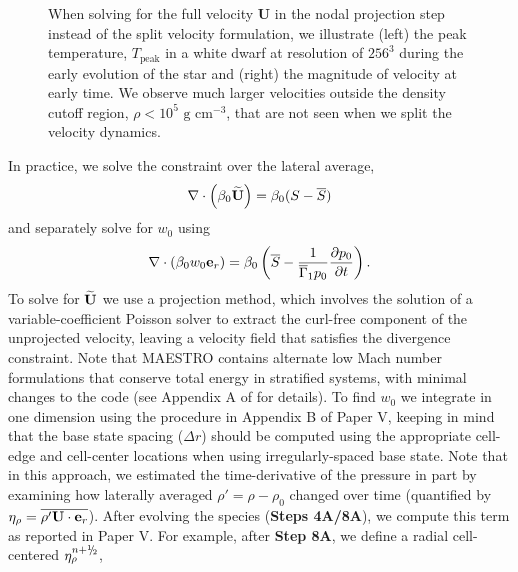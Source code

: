 \begin{figure}[htb]
\begin{center}
\begin{tabular}{l c}
\end{tabular}
\caption{\label{fig:wdconvect_splitU} When solving for the full velocity $\mathbf{U}$ in the nodal projection step instead of the split velocity 
  formulation, we illustrate
  (left) the peak temperature, $T_{\text{peak}}$ in a white dwarf at resolution of $256^3$ during the early evolution of the star and
  (right) the magnitude of velocity at early time. We observe much larger velocities outside the density cutoff region, $\rho < 10^5 \text{ g cm}^{-3}$, 
  that are not seen when we split the velocity dynamics.}
\end{center}
\end{figure}

In practice, we solve the constraint over the lateral average,
\begin{equation}
\nabla\cdot\left(\beta_0\Ubt\right) = \beta_0(S-\overline{S})
\end{equation}
and separately solve for $w_0$ using 
\begin{equation}
\nabla\cdot(\beta_0w_0\eb_r) = \beta_0\left(\overline{S} - \frac{1}{\gammaonebar p_0}\frac{\partial p_0}{\partial t}\right).
\end{equation}
To solve for $\widetilde{{\bf{U}}}$ we use a projection method, which involves the solution of a variable-coefficient Poisson solver to extract the curl-free component of the unprojected velocity, leaving a velocity field that satisfies the divergence constraint.
Note that MAESTRO contains alternate low Mach number formulations that conserve total energy in stratified systems, with minimal changes to the code (see Appendix A of \cite{subChandra_II} for details).
To find $w_0$ we integrate in one dimension using the procedure in Appendix B of Paper V, keeping in mind that the base state spacing ($\Delta r$) should be computed using the appropriate cell-edge and cell-center locations when using irregularly-spaced base state.
Note that in this approach, we estimated the time-derivative of the pressure in part by examining how laterally averaged $\rho'=\rho-\rho_0$ changed over time (quantified by $\eta_\rho = \overline{\rho'{\bf{U}}\cdot{\bf{e}}_r}$).  After evolving the species ({\bf Steps 4A/8A}), we compute this term as reported in Paper V. For example, after {\bf Step 8A}, we define a radial cell-centered $\etarho^{\nph}$, 

